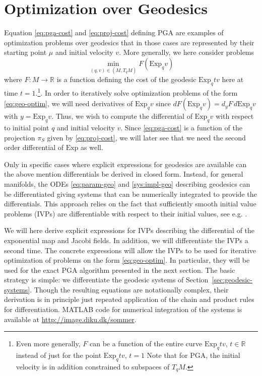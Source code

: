 \documentclass[final]{svjour3}
\newcommand{\RR}{\mathbb{R}}
\newcommand{\Exp}{\mathrm{Exp}}
\begin{document}
\section{Optimization over Geodesics}
\label{sec:differentials}
Equation \eqref{eq:pga-cost} and \eqref{eq:proj-cost} defining 
PGA are examples of optimization problems over geodesics that in those cases are
represented by their starting point $\mu$ and initial velocity $v$.
More generally, we here consider problems
\begin{equation}
  \min_{(q,v)\in (M,T_q M)}F(\Exp_q v)
  \label{eq:geo-optim}
\end{equation}
where $F:M\rightarrow\RR$ is a function defining the cost of the geodesic
$\Exp_q tv$ here at time $t=1$.\footnote{Even more generally, $F$
can be a function of the entire curve $\Exp_q tv$, $t\in\RR$ instead of just
for the point $\Exp_q tv$, $t=1$ Note that for PGA, the initial velocity is in addition
constrained to subspaces of $T_q M$.}. In order to iteratively solve
optimization problems of the form \eqref{eq:geo-optim}, we will need 
derivatives of $\Exp_q v$ since
$d F(\Exp_q v)=d_yF\,d \Exp_q v$
with $y=\Exp_q v$. Thus, we wish to compute the differential of $\Exp_q v $
with respect to initial point $q$ and initial velocity $v$.
Since \eqref{eq:pga-cost} is a function of the
projection $\pi_S$ given by \eqref{eq:proj-cost}, we will later see that we need the second 
order differential of $\Exp$ as well.

Only in specific cases where explicit expressions for geodesics are available
can the above mention differentials be derived in closed form. Instead, for general
manifolds, the ODEs \eqref{eq:param-geo} and \eqref{sys:impl-geo} describing geodesics 
can be differentiated giving systems that can be numerically integrated to
provide the differentials.
This approach relies on the fact that sufficiently smooth initial value problems
(IVPs) are
differentiable with respect to their initial values, see e.g. \cite[Chap.
I.14]{hairer_solving_2008}.

We will here derive explicit expressions for IVPs describing the 
differential of the exponential map and Jacobi fields. In addition, we 
will differentiate the IVPs a second time. The concrete expressions will allow
the IVPs to be used for iterative optimization of problems on the form
\eqref{eq:geo-optim}. In particular, they will be used for the
exact PGA algorithm presented in the next section. 
The basic strategy is simple: we differentiate the geodesic systems of
Section~\ref{sec:geodesic-systems}. Though the resulting equations are
notationally complex, 
their derivation is in principle just repeated application of the
chain and product rules for differentiation.
MATLAB code for numerical integration of the systems is available at
\url{http://image.diku.dk/sommer}.
\end{document}
